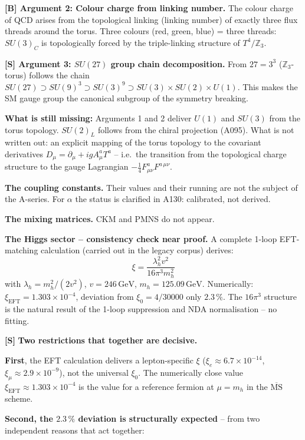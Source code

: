 \textbf{[B] Argument 2: Colour charge from linking number.}
The colour charge of QCD arises from the topological linking (linking number) of
exactly three flux threads around the torus. Three colours (red, green, blue) =
three threads: $SU(3)_C$ is topologically forced by the triple-linking structure
of $T^4/\mathbb{Z}_3$.

\textbf{[S] Argument 3: $SU(27)$ group chain decomposition.}
From $27=3^3$ ($\mathbb{Z}_3$-torus) follows the chain
$SU(27)\supset SU(9)^3\supset SU(3)^9\supset SU(3)\times SU(2)\times U(1)$.
This makes the SM gauge group the canonical subgroup of the symmetry breaking.

\textbf{What is still missing:} Arguments 1 and 2 deliver $U(1)$ and $SU(3)$
from the torus topology. $SU(2)_L$ follows from the chiral projection (A095).
What is not written out: an explicit mapping of the torus topology to the covariant
derivatives $D_\mu = \partial_\mu + igA_\mu^a T^a$ -- i.e.\ the transition from
the topological charge structure to the gauge Lagrangian
$-\tfrac14 F_{\mu\nu}^a F^{a\,\mu\nu}$.

\textbf{The coupling constants.} Their values and their running are not the
subject of the A-series. For $\alpha$ the status is clarified in A130:
calibrated, not derived.

\textbf{The mixing matrices.} CKM and PMNS do not appear.

\textbf{The Higgs sector -- consistency check near proof.} A complete 1-loop
EFT-matching calculation (carried out in the legacy corpus) derives:
\[
  \xi = \frac{\lambda_h^2 v^2}{16\pi^3 m_h^2}
\]
with $\lambda_h=m_h^2/(2v^2)$, $v=246\,\text{GeV}$, $m_h=125{.}09\,\text{GeV}$.
Numerically: $\xi_\text{EFT}=1{.}303\times10^{-4}$, deviation from
$\xi_0=4/30000$ only $2{.}3\,\%$. The $16\pi^3$ structure is the natural result
of the 1-loop suppression and NDA normalisation -- no fitting.

\textbf{[S]} \textbf{Two restrictions that together are decisive.}

\textbf{First}, the EFT calculation delivers a lepton-specific $\xi$
($\xi_e\approx6{.}7\times10^{-14}$, $\xi_\mu\approx2{.}9\times10^{-9}$), not the
universal $\xi_0$. The numerically close value $\xi_\text{EFT}\approx1{.}303\times10^{-4}$
is the value for a reference fermion at $\mu=m_h$ in the $\overline{\text{MS}}$
scheme.

\textbf{Second, the $2{.}3\,\%$ deviation is structurally expected} -- from two
independent reasons that act together:

